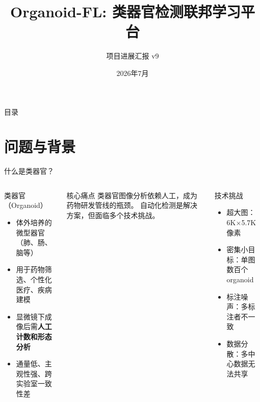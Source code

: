 \documentclass[aspectratio=169, 10pt]{beamer}
\title[Organoid-FL]{Organoid-FL: 类器官检测联邦学习平台}
\subtitle{项目进展汇报 v9}
\date{2026年7月}
\begin{document}
\begin{frame}[plain]
  \titlepage
\end{frame}

\begin{frame}{目录}
  \tableofcontents
\end{frame}

\section{问题与背景}

\begin{frame}{什么是类器官？}
  \begin{columns}[T]
    \begin{block}{类器官（Organoid）}
      \begin{itemize}
        \item 体外培养的微型器官（肺、肠、脑等）
        \item 用于药物筛选、个性化医疗、疾病建模
        \item 显微镜下成像后需\textbf{人工计数和形态分析}
        \item 通量低、主观性强、跨实验室一致性差
      \end{itemize}
    \end{block}
    \vspace{0em}
    \begin{alertblock}{核心痛点}
      类器官图像分析依赖人工，成为药物研发管线的瓶颈。
      自动化检测是解决方案，但面临多个技术挑战。
    \end{alertblock}
    \begin{block}{技术挑战}
      \begin{itemize}
        \item \alert{超大图}：6K$\times$5.7K 像素
        \item \alert{密集小目标}：单图数百个 organoid
        \item \alert{标注噪声}：多标注者不一致
        \item \alert{数据分散}：多中心数据无法共享
      \end{itemize}
    \end{block}
  \end{columns}
\end{frame}
\end{document}

